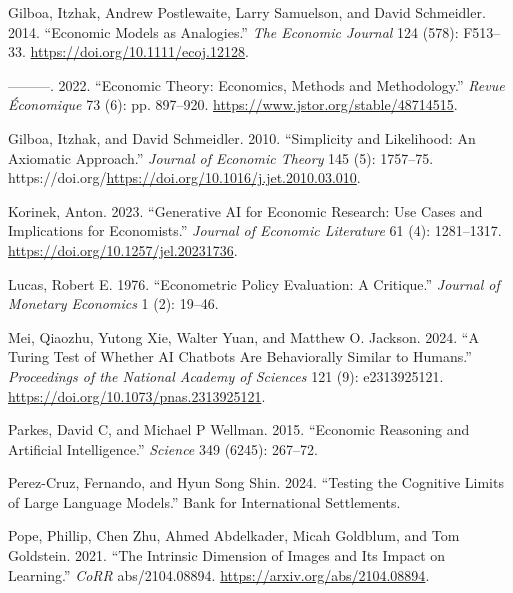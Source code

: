 \documentclass[
]{article}
\newlength{\cslhangindent}
\newlength{\cslentryspacingunit} %
\newenvironment{CSLReferences}[2] %
 {%
  \setlength{\parindent}{0pt}
  \ifodd #1
  \let\oldpar\par
  \def\par{\hangindent=\cslhangindent\oldpar}
  \fi
  \setlength{\parskip}{#2\cslentryspacingunit}
 }%
 {}
\begin{document}
\begin{CSLReferences}{1}{0}
\leavevmode{}%
Gilboa, Itzhak, Andrew Postlewaite, Larry Samuelson, and David
Schmeidler. 2014. {``{Economic Models as Analogies}.''} \emph{The
Economic Journal} 124 (578): F513--33.
\url{https://doi.org/10.1111/ecoj.12128}.

\leavevmode{}%
---------. 2022. {``Economic Theory: Economics, Methods and
Methodology.''} \emph{Revue Économique} 73 (6): pp. 897--920.
\url{https://www.jstor.org/stable/48714515}.

\leavevmode{}%
Gilboa, Itzhak, and David Schmeidler. 2010. {``Simplicity and
Likelihood: An Axiomatic Approach.''} \emph{Journal of Economic Theory}
145 (5): 1757--75.
https://doi.org/\url{https://doi.org/10.1016/j.jet.2010.03.010}.

\leavevmode{}%
Korinek, Anton. 2023. {``Generative AI for Economic Research: Use Cases
and Implications for Economists.''} \emph{Journal of Economic
Literature} 61 (4): 1281--1317.
\url{https://doi.org/10.1257/jel.20231736}.

\leavevmode{}%
Lucas, Robert E. 1976. {``Econometric Policy Evaluation: A Critique.''}
\emph{Journal of Monetary Economics} 1 (2): 19--46.

\leavevmode{}%
Mei, Qiaozhu, Yutong Xie, Walter Yuan, and Matthew O. Jackson. 2024.
{``A Turing Test of Whether AI Chatbots Are Behaviorally Similar to
Humans.''} \emph{Proceedings of the National Academy of Sciences} 121
(9): e2313925121. \url{https://doi.org/10.1073/pnas.2313925121}.

\leavevmode{}%
Parkes, David C, and Michael P Wellman. 2015. {``Economic Reasoning and
Artificial Intelligence.''} \emph{Science} 349 (6245): 267--72.

\leavevmode{}%
Perez-Cruz, Fernando, and Hyun Song Shin. 2024. {``Testing the Cognitive
Limits of Large Language Models.''} Bank for International Settlements.

\leavevmode{}%
Pope, Phillip, Chen Zhu, Ahmed Abdelkader, Micah Goldblum, and Tom
Goldstein. 2021. {``The Intrinsic Dimension of Images and Its Impact on
Learning.''} \emph{CoRR} abs/2104.08894.
\url{https://arxiv.org/abs/2104.08894}.


\end{CSLReferences}
\end{document}
